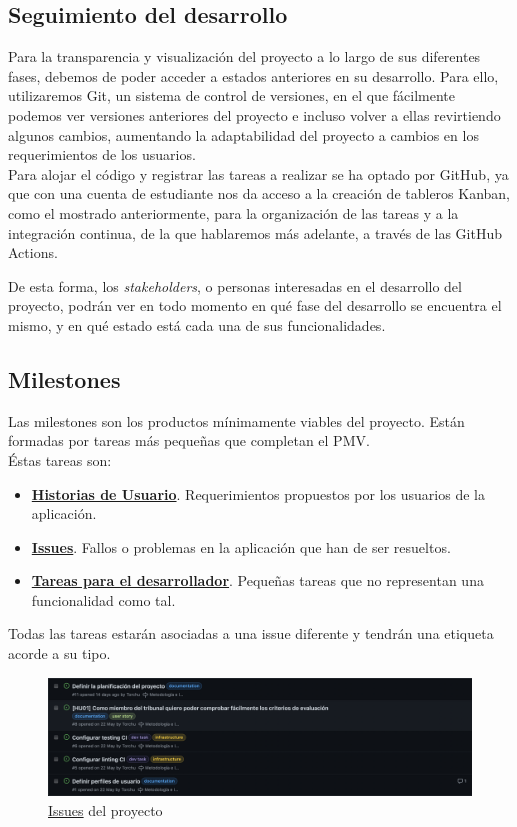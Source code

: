 \subsection{Seguimiento del desarrollo}
Para la transparencia y visualización del proyecto a lo largo de sus diferentes fases, debemos de poder acceder a
estados anteriores en su desarrollo. Para ello, utilizaremos Git, un sistema de control de versiones, en el que
fácilmente podemos ver versiones anteriores del proyecto e incluso volver a ellas revirtiendo algunos cambios,
aumentando la adaptabilidad del proyecto a cambios en los requerimientos de los usuarios.\\

Para alojar el código y registrar las tareas a realizar se ha optado por GitHub, ya que con una cuenta de estudiante
nos da acceso a la creación de tableros Kanban, como el mostrado anteriormente, para la organización de las tareas y a
la integración continua, de la que hablaremos más adelante, a través de las GitHub Actions.

De esta forma, los \textit{stakeholders}, o personas interesadas en el desarrollo del proyecto, podrán ver en todo
momento en qué fase del desarrollo se encuentra el mismo, y en qué estado está cada una de sus funcionalidades.\\

\subsection{Milestones}
Las milestones son los productos mínimamente viables del proyecto. Están formadas por tareas más pequeñas que completan
el PMV.\\

Éstas tareas son:
\begin{itemize}
    \item \href{https://github.com/Torchu/flixbuff/labels/user%20story}{\textbf{Historias de Usuario}}. Requerimientos
    propuestos por los usuarios de la aplicación.
    \item \href{https://github.com/Torchu/flixbuff/labels/issue}{\textbf{Issues}}. Fallos o problemas en la aplicación
    que han de ser resueltos.
    \item \href{https://github.com/Torchu/flixbuff/labels/dev%20task}{\textbf{Tareas para el desarrollador}}. Pequeñas
    tareas que no representan una funcionalidad como tal.
\end{itemize}

Todas las tareas estarán asociadas a una issue diferente y tendrán una etiqueta acorde a su tipo.
\begin{figure}[H]
	\centering	
	\includegraphics[scale=0.25]{img/issues.png}
	\caption{\href{https://github.com/Torchu/flixbuff/issues}{Issues} del proyecto}\label{fig:github_issues}
\end{figure}

